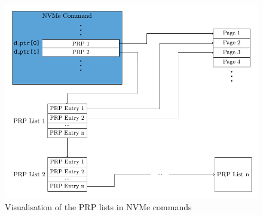 \begin{figure}
  \centering
    \includegraphics[width=\textwidth]{figures/prp-list}
    \caption{Visualisation of the PRP lists in NVMe commands}
    \label{fig:prp-list}
\end{figure}





